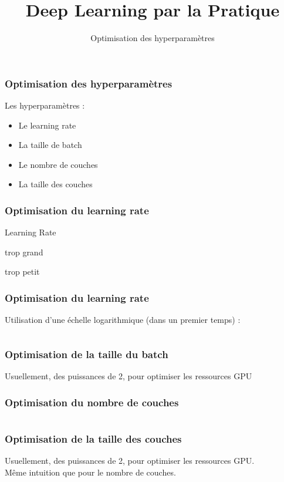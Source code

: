 \documentclass{formation}
\title{Deep Learning par la Pratique}
\subtitle{Optimisation des hyperparamètres}
\begin{document}
\maketitle

\begin{frame}
  \frametitle{Optimisation des hyperparamètres}
  \begin{minipage}[l]{0.49\linewidth}
  \end{minipage}\hfill
  \begin{minipage}[l]{0.49\linewidth}
  Les hyperparamètres :
  \begin{itemize}
  \item Le learning rate
  \item La taille de batch
  \item Le nombre de couches
  \item La taille des couches
  \end{itemize}
  \end{minipage}\hfill
\end{frame}

\begin{frame}
  \frametitle{Optimisation du learning rate}
  \begin{center}Learning Rate\end{center}
  \begin{minipage}[l]{0.49\linewidth}
    \begin{center}trop grand\end{center}
  \end{minipage}\hfill
  \begin{minipage}[l]{0.49\linewidth}
    \begin{center}trop petit\end{center}
  \end{minipage}\hfill
\end{frame}

\begin{frame}
  \frametitle{Optimisation du learning rate}
  Utilisation d'une échelle logarithmique (dans un premier temps) :
  \inputminted[linenos,fontsize=\small,bgcolor=pythonbg]{python}{code-illustration/gridsearch-template.py}
\end{frame}

\begin{frame}
  \frametitle{Optimisation de la taille du batch}
  Usuellement, des puissances de 2, pour optimiser les ressources GPU
\end{frame}

\begin{frame}
  \frametitle{Optimisation du nombre de couches}
  \inputminted[linenos,fontsize=\small,bgcolor=pythonbg]{python}{code-illustration/addlayer-template.py}
\end{frame}

\begin{frame}
  \frametitle{Optimisation de la taille des couches}
  Usuellement, des puissances de 2, pour optimiser les ressources GPU. \\
  Même intuition que pour le nombre de couches.
\end{frame}
\end{document}
